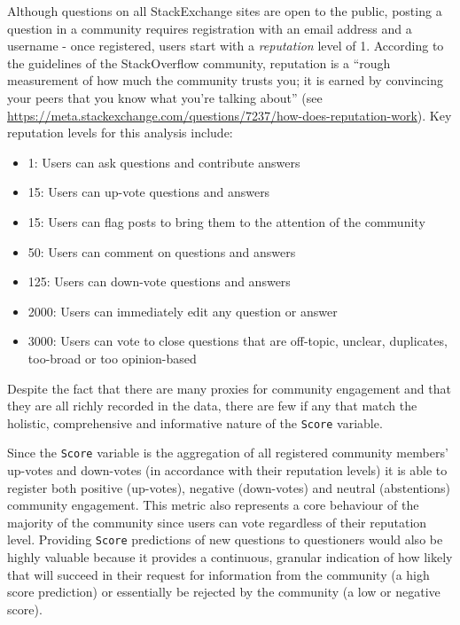 \documentclass[11pt,preprint, authoryear]{article}
\numberwithin{equation}{section}
\begin{document}
Although questions on all StackExchange sites are open to the public,
posting a question in a community requires registration with an email
address and a username - once registered, users start with a
\emph{reputation} level of 1. According to the guidelines of the
StackOverflow community, reputation is a ``rough measurement of how much
the community trusts you; it is earned by convincing your peers that you
know what you're talking about'' (see
\url{https://meta.stackexchange.com/questions/7237/how-does-reputation-work}).
Key reputation levels for this analysis include:


\begin{itemize}
\item
  1: Users can ask questions and contribute answers
\item
  15: Users can up-vote questions and answers
\item
  15: Users can flag posts to bring them to the attention of the
  community
\item
  50: Users can comment on questions and answers
\item
  125: Users can down-vote questions and answers
\item
  2000: Users can immediately edit any question or answer
\item
  3000: Users can vote to close questions that are off-topic, unclear,
  duplicates, too-broad or too opinion-based
\end{itemize}


Despite the fact that there are many proxies for community engagement
and that they are all richly recorded in the data, there are few if any
that match the holistic, comprehensive and informative nature of the
\texttt{Score} variable.

Since the \texttt{Score} variable is the aggregation of all registered
community members' up-votes and down-votes (in accordance with their
reputation levels) it is able to register both positive (up-votes),
negative (down-votes) and neutral (abstentions) community engagement.
This metric also represents a core behaviour of the majority of the
community since users can vote regardless of their reputation level.
Providing \texttt{Score} predictions of new questions to questioners
would also be highly valuable because it provides a continuous, granular
indication of how likely that will succeed in their request for
information from the community (a high score prediction) or essentially
be rejected by the community (a low or negative score).
\end{document}
